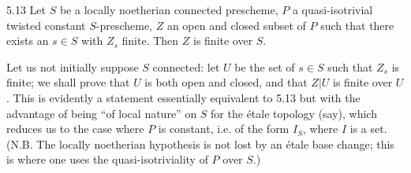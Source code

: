 \begin{lemma}{5.13}\label{X.5.13}
Let $S$ be a locally noetherian connected prescheme, $P$ a quasi-isotrivial twisted constant $S$-prescheme, $Z$ an open and closed subset of $P$ such that there exists an $s\in S$ with $Z_s$ finite. Then $Z$ is finite over $S$.
\end{lemma}
Let us not initially suppose $S$ connected: let $U$ be the set of $s\in S$ such that $Z_s$ is finite; we shall prove that $U$ is both open and closed, and that $Z|U$ is finite over $U$. This is evidently a statement essentially equivalent to 5.13 but with the advantage of being ``of local nature'' on $S$ for the étale topology (say), which reduces us to the case where $P$ is constant, i.e. of the form $I_S$, where $I$ is a set. (N.B. The locally noetherian hypothesis is not lost by an étale base change; this is where one uses the quasi-isotriviality of $P$ over $S$.)

